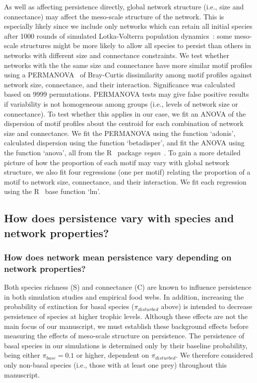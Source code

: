 \documentclass[12pt]{article}
\begin{document}
\begin{spacing}{2.0}
        As well as affecting persistence directly, global network structure (i.e., size and connectance) may affect the meso-scale structure of the network.
        This is especially likely since we include only networks which can retain all initial species after 1000 rounds of simulated Lotka-Volterra population dynamics~\citep{Cirtwill2021_inprep}:  some meso-scale structures might be more likely to allow all species to persist than others in networks with different size and connectance constraints.
        We test whether networks with the the same size and connectance have more similar motif profiles using a PERMANOVA~\citep{Anderson2001} of Bray-Curtis dissimilarity among motif profiles against network size, connectance, and their interaction.
        Significance was calculated based on 9999 permutations.
        PERMANOVA tests may give false positive results if variability is not homogeneous among groups (i.e., levels of network size or connectance).
        To test whether this applies in our case, we fit an ANOVA of the dispersion of motif profiles about the centroid for each combination of network size and connectance. 
        We fit the PERMANOVA using the function `adonis', calculated dispersion using the function `betadisper', and fit the ANOVA using the function `anova', all from the R~\citep{R} package \emph{vegan}~\citep{vegan}.
        To gain a more detailed picture of how the proportion of each motif may vary with global network structure, we also fit four regressions (one per motif) relating the proportion of a motif to network size, connectance, and their interaction.
        We fit each regression using the R~\citep{R} base function `lm'.
            

    \subsection{How does persistence vary with species and network properties?}

        \subsubsection{How does network mean persistence vary depending on network properties?}
    
            Both species richness (S) and connectance (C) are known to influence persistence in both simulation studies and empirical food webs.
            In addition, increasing the probability of extinction for basal species ($\pi_{disturbed}$ above) is intended to decrease persistence of species at higher trophic levels.
            Although these effects are not the main focus of our manuscript, we must establish these background effects before measuring the effects of meso-scale structure on persistence.
            The persistence of basal species in our simulations is determined only by their baseline probability, being either $\pi_{base} = 0.1$ or higher, dependent on $\pi_{disturbed}$.
            We therefore considered only non-basal species (i.e., those with at least one prey) throughout this manuscript.


\end{spacing}
\end{document}
